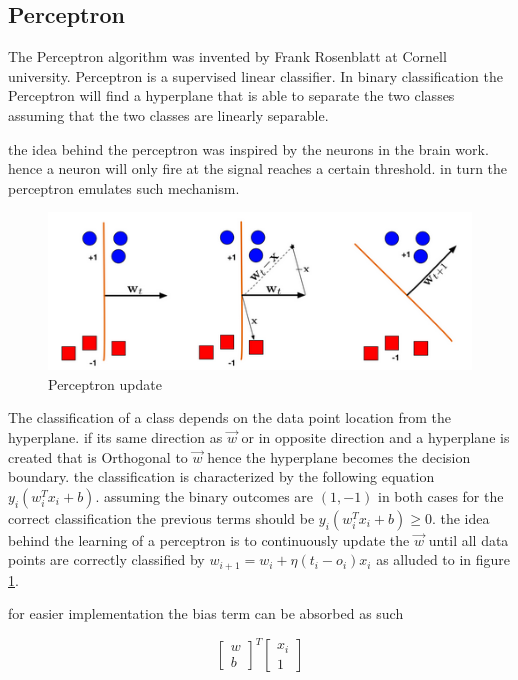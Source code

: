 \documentclass[10pt,twocolumn,letterpaper]{article}
\begin{document}
\subsection{Perceptron}
The Perceptron algorithm was invented by Frank Rosenblatt at Cornell university. \cite{Rosenblatt1958} Perceptron is a supervised linear classifier. In binary classification the Perceptron will find a hyperplane that is able to separate the two classes assuming that the two classes are linearly separable.\cite{Murphy2017} \cite{Minsky1969} 

the idea behind the perceptron was inspired by the neurons in the brain work. hence a neuron will only fire at the signal reaches a certain threshold. in turn the perceptron emulates such mechanism.  

\begin{figure}[h!]
  \includegraphics[width=\linewidth]{update.png}
  \caption{Perceptron update}
  \label{fig:Perceptron}
\end{figure}


The classification of a class depends on the data point location from the hyperplane. if its same direction as $\overrightarrow{w}$ or in opposite direction and a hyperplane is created that is Orthogonal to $\overrightarrow{w}$ hence the hyperplane becomes the decision boundary. the classification is characterized by the following equation $y_{i}\left( w_{i}^{T}x_{i}+b\right)$. assuming the binary outcomes are $(1, -1 )$ in both cases for the correct classification the previous terms should be $y_{i}\left( w_{i}^{T}x_{i}+b\right) \geq 0$. the idea behind the learning of a perceptron is to continuously update the $\overrightarrow{w}$ until all data points are correctly classified by $w_{i+1}=w_{i}+\eta \left( t_{i}-o_{i}\right) x_{i}$ as alluded to in figure \ref{fig:Perceptron}.

 
for easier implementation the bias term can be absorbed as such

\begin{equation}
\begin{bmatrix}
w \\
b
\end{bmatrix}^{T}\begin{bmatrix}
x_{i} \\
1
\end{bmatrix}
\end{equation}
\end{document}
